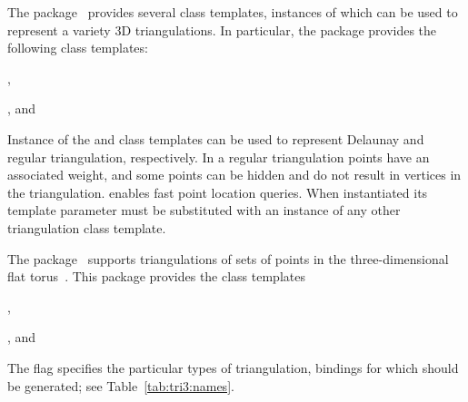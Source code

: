 The \iiiDTriangulationsPackage{} package~\cite{cgal:pt-t3-21a}
provides several class templates, instances of which can be used to
represent a variety 3D triangulations. In particular, the package
provides the following class templates:
\begin{compactenum}
\item {},
\item {}, and
\item {}
\item {}
\end{compactenum}
Instance of the  and
 class templates can be used
to represent Delaunay and regular triangulation, respectively. In a
regular triangulation points have an associated weight, and some
points can be hidden and do not result in vertices in the
triangulation.  enables fast
point location queries. When instantiated its template parameter must
be substituted with an instance of any other triangulation class template.

The \iiiDPeriodicTriangulationsPackage{}
package~\cite{cgal:ct-pt3-21a} supports triangulations of sets of
points in the three-dimensional flat torus~\cite{ct-cpt-09}. This
package provides the class templates
\begin{compactenum}
\item {},
\item {}, and
\item {}
\item {}
\end{compactenum}

The \cmake{} flag  specifies the particular
types of triangulation, bindings for which should be generated; see
Table~\ref{tab:tri3:names}.


